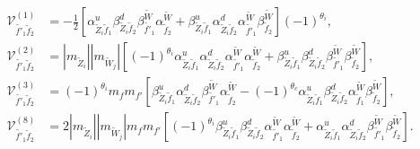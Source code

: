 \documentclass[final,3p,times]{elsarticle}
\begin{document}
\begin{align}
\mathcal{V}_{\tilde{f'}_1 \tilde{f}_2}^{(1)} &= -\frac{1}{2}\left[\alpha_{\tilde{Z}_i \tilde{f}_1}^{u} \beta_{\tilde{Z}_i \tilde{f}_2}^{d} \beta_{\tilde{f'}_1}^{\tilde{W}}\alpha_{\tilde{f}_2}^{\tilde{W}} + \beta_{\tilde{Z}_i \tilde{f}_1}^{u} \alpha_{\tilde{Z}_i \tilde{f}_2}^{d} \alpha_{\tilde{f'}_1}^{\tilde{W}} \beta_{\tilde{f}_2}^{\tilde{W}}\right](-1)^{\theta_i}, \\
\mathcal{V}_{\tilde{f'}_1 \tilde{f}_2}^{(2)} &= |m_{\tilde{Z}_i}||m_{\tilde{W}_j}|\left[(-1)^{\theta_i} \alpha_{\tilde{Z}_i \tilde{f}_1}^{u} \alpha_{\tilde{Z}_i \tilde{f}_2}^{d} \alpha_{\tilde{f'}_1}^{\tilde{W}} \alpha_{\tilde{f}_2}^{\tilde{W}} + \beta_{\tilde{Z}_i \tilde{f}_1}^{u} \beta_{\tilde{Z}_{i} \tilde{f}_2}^{d} \beta_{\tilde{f'}_1}^{\tilde{W}} \beta_{\tilde{f}_2}^{\tilde{W}}\right], \\
\mathcal{V}_{\tilde{f'}_1 \tilde{f}_2}^{(3)} &= (-1)^{\theta_i} m_{f}m_{f'}\left[\beta_{\tilde{Z}_i \tilde{f}_1}^{u} \alpha_{\tilde{Z}_i \tilde{f}_2}^{d} \beta_{\tilde{f'}_1}^{\tilde{W}} \alpha_{\tilde{f}_2}^{\tilde{W}} - (-1)^{\theta_c} \alpha_{\tilde{Z}_i \tilde{f}_1}^{u} \beta_{\tilde{Z}_i \tilde{f}_2}^{d} \alpha_{\tilde{f}_1}^{\tilde{W}} \beta_{\tilde{f}_2}^{\tilde{W}}\right], \\
\mathcal{V}_{\tilde{f'}_1 \tilde{f}_2}^{(8)} &= 2 |m_{\tilde{Z}_i}||m_{\tilde{W}_j}|m_{f} m_{f'} \left[(-1)^{\theta_i}\beta_{\tilde{Z}_i \tilde{f}_1}^{u}\beta_{\tilde{Z}_i \tilde{f}_2}^{d} \alpha_{\tilde{f'}_1}^{\tilde{W}} \alpha_{\tilde{f}_2}^{\tilde{W}} + \alpha_{\tilde{Z}_i \tilde{f}_1}^{u} \alpha_{\tilde{Z}_i \tilde{f}_2}^{d} \beta_{\tilde{f'}_1}^{\tilde{W}} \beta_{\tilde{f}_2}^{\tilde{W}}\right].
\end{align}
\end{document}
